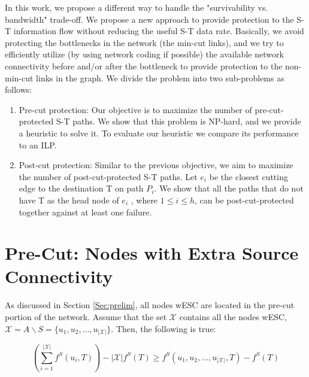 \documentclass[conference]{IEEEtran}
\newcommand{\mc}[1]{\mathcal{#1}}
\begin{document}
In this work, we propose a different way to handle the "survivability vs. bandwidth" trade-off. We propose a new approach to provide protection to the S-T information flow without reducing the useful S-T data rate. Basically, we avoid protecting the bottlenecks in the network (the min-cut links), and we try to efficiently utilize (by using network coding if possible) the available network connectivity before and/or after the bottleneck to provide protection to the non-min-cut links in the graph. We divide the problem into two sub-problems as follows:

\begin{enumerate}
\item Pre-cut protection: Our objective is to maximize the number of pre-cut-protected S-T paths. We show that this problem is NP-hard, and we provide a heuristic to solve it. To evaluate our heuristic we compare its performance to an ILP.
\item Post-cut protection: Similar to the previous objective, we aim to maximize the number of post-cut-protected S-T paths. Let $e_i$ be the closest cutting edge to the destination T on path $P_i$. We show that all the paths that do not have T as the head node of $e_i$ , where $1 \leq i \leq h$, can be post-cut-protected together against at least one failure. 
\end{enumerate}


















\section{Pre-Cut: Nodes with Extra Source Connectivity}
\label{Sec:preCut}

As discussed in Section \ref{Sec:prelim}, all nodes wESC are located in the pre-cut portion of the network. Assume that the set $\mc{X}$ contains all the nodes wESC, $\mc{X}=A \backslash S = \{u_1, u_2, \dots, u_{|\mc{X}|}\}$. Then, the following is true:

\begin{equation}
\label{equ:UnrealESC}
(\sum^{|\mc{X}|}_{i=1} f^S(u_i,T)) - |\mc{X}|f^S(T)  \geq f^S(u_1, u_2, \dots, u_{|\mc{X}|}, T) - f^S(T) 
\end{equation}
\end{document}

